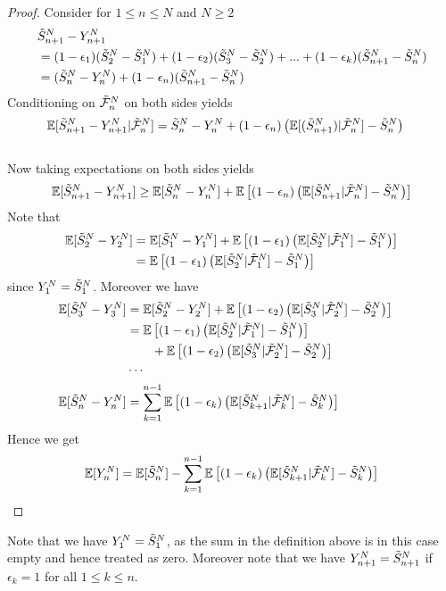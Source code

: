 %
\begin{proof}
	Consider for $1\leq n\leq N$ and $N\geq 2$
	\begin{align*}
	&  \tilde{S}_{n+1}^N - Y_{n+1}^N \\ 
	&= (1-\epsilon_1)(\tilde{S}_{2}^N - \tilde{S}_{1}^N) + (1-\epsilon_2)(\tilde{S}_{3}^N - \tilde{S}_{2}^N) + ... + (1-\epsilon_k)(\tilde{S}_{n+1}^N - \tilde{S}_{n}^N)\\ 
	&= (\tilde{S}_{n}^N - Y_{n}^N) + (1-\epsilon_n)(\tilde{S}_{n+1}^N - \tilde{S}_{n}^N) 
	\end{align*}
	Conditioning on $\tilde{\mathcal{F}}_{n}^N$ on both sides yields
	\begin{align*}
	\mathbb{E}[\tilde{S}_{n+1}^N - Y_{n+1}^N|\tilde{\mathcal{F}}_{n}^N] &= \tilde{S}_{n}^N - Y_{n}^N + (1-\epsilon_n)\left(\mathbb{E}[(\tilde{S}_{n+1}^N)|\tilde{\mathcal{F}}_{n}^N]  - \tilde{S}_{n}^N \right)
	\end{align*}
	\\
	Now taking expectations on both sides yields
	$$\mathbb{E}[\tilde{S}_{n+1}^N - Y_{n+1}^N] \geq \mathbb{E}[\tilde{S}_{n}^N - Y_{n}^N] + \mathbb{E}\left[(1-\epsilon_n)\left(\mathbb{E}[\tilde{S}_{n+1}^N|\tilde{\mathcal{F}}_{n}^N]  - \tilde{S}_{n}^N \right)\right]$$
	Note that 
	\begin{align*}
	\mathbb{E}[\tilde{S}_{2}^N - Y_{2}^N] &= \mathbb{E}[\tilde{S}_{1}^N - Y_{1}^N] + \mathbb{E}\left[(1-\epsilon_1)\left(\mathbb{E}[\tilde{S}_{2}^N|\tilde{\mathcal{F}}_{1}^N]  - \tilde{S}_{1}^N \right)\right]\\ 
	&= \mathbb{E}\left[(1-\epsilon_1)\left(\mathbb{E}[\tilde{S}_{2}^N|\tilde{\mathcal{F}}_{1}^N]  - \tilde{S}_{1}^N \right)\right]\\ 
	\end{align*}
	since $Y_{1}^N = \tilde{S}_{1}^N$. Moreover we have
	\begin{align*}
	\mathbb{E}[\tilde{S}_{3}^N - Y_{3}^N] &= \mathbb{E}[\tilde{S}_{2}^N - Y_{2}^N] + \mathbb{E}\left[(1-\epsilon_2)\left(\mathbb{E}[\tilde{S}_{3}^N|\tilde{\mathcal{F}}_{2}^N]  - \tilde{S}_{2}^N \right)\right]\\  
	&= \mathbb{E}\left[(1-\epsilon_1)\left(\mathbb{E}[\tilde{S}_{2}^N|\tilde{\mathcal{F}}_{1}^N]  - \tilde{S}_{1}^N \right)\right]\\
	&\qquad + \mathbb{E}\left[(1-\epsilon_2)\left(\mathbb{E}[\tilde{S}_{3}^N|\tilde{\mathcal{F}}_{2}^N]  - \tilde{S}_{2}^N \right)\right]\\  
	&\cdots& \\ 
	\mathbb{E}[\tilde{S}_{n}^N - Y_{n}^N] &= \sum_{k=1}^{n-1}\mathbb{E}\left[(1-\epsilon_k)\left(\mathbb{E}[\tilde{S}_{k+1}^N|\tilde{\mathcal{F}}_{k}^N]  - \tilde{S}_{k}^N \right)\right]
	\end{align*}
	Hence we get
	\begin{equation*}
	\mathbb{E}[Y_{n}^N] = \mathbb{E}[\tilde{S}_{n}^N] - \sum_{k=1}^{n-1}\mathbb{E}\left[(1-\epsilon_k)\left(\mathbb{E}[\tilde{S}_{k+1}^N|\tilde{\mathcal{F}}_{k}^N]  - \tilde{S}_{k}^N \right)\right]
	\end{equation*}	
\end{proof}
%
\begin{remark}
	Note that we have $Y_{1}^N=\tilde{S}_{1}^N$, as the sum in the definition above is in this case empty and hence treated as zero. Moreover note that we have $Y_{n+1}^N = \tilde{S}_{n+1}^N$ if $\epsilon_k=1$ for all $1\leq k \leq n$. 
\end{remark}
